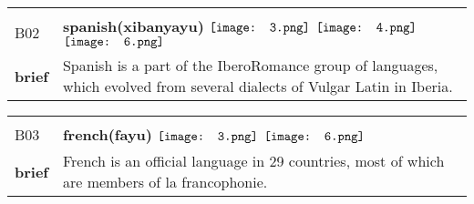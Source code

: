 \documentclass[UTF8]{article}
\begin{document}
            \begin{tabularx}{\textwidth}{p{1.5cm}X}
            \arrayrulecolor{myBlue}
        	\hline\\
            \small{B02}&
            \large{\bfseries{spanish(xibanyayu)}}\hfill
                                                            \phantom{$\vcenter{\hbox{\texttt{[image: 1.png]}}}$}
                                                                \phantom{$\vcenter{\hbox{\texttt{[image: 2.png]}}}$}
                                                                $\vcenter{\hbox{\texttt{[image: 3.png]}}}$
                                                                $\vcenter{\hbox{\texttt{[image: 4.png]}}}$
                                                                \phantom{$\vcenter{\hbox{\texttt{[image: 5.png]}}}$}
                                                                $\vcenter{\hbox{\texttt{[image: 6.png]}}}$
                                                                \phantom{$\vcenter{\hbox{\texttt{[image: 7.png]}}}$}
                                        \\[10pt]
            \large{\bfseries{brief}}&\noindent\parbox[c]{\hsize}{Spanish is a part of the IberoRomance group of languages, which evolved from several dialects of Vulgar Latin in Iberia.} \\[5pt]
            \hline\\[-10pt]
        \end{tabularx}
            \begin{tabularx}{\textwidth}{p{1.5cm}X}
            \arrayrulecolor{myBlue}
        	\hline\\
            \small{B03}&
            \large{\bfseries{french(fayu)}}\hfill
                                                            \phantom{$\vcenter{\hbox{\texttt{[image: 1.png]}}}$}
                                                                \phantom{$\vcenter{\hbox{\texttt{[image: 2.png]}}}$}
                                                                $\vcenter{\hbox{\texttt{[image: 3.png]}}}$
                                                                \phantom{$\vcenter{\hbox{\texttt{[image: 4.png]}}}$}
                                                                \phantom{$\vcenter{\hbox{\texttt{[image: 5.png]}}}$}
                                                                $\vcenter{\hbox{\texttt{[image: 6.png]}}}$
                                                                \phantom{$\vcenter{\hbox{\texttt{[image: 7.png]}}}$}
                                        \\[10pt]
            \large{\bfseries{brief}}&\noindent\parbox[c]{\hsize}{French is an official language in 29 countries, most of which are members of la francophonie.} \\[5pt]
            \hline\\[-10pt]
        \end{tabularx}
\end{document}
